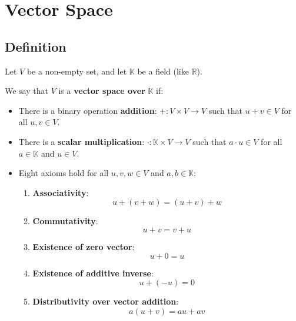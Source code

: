 \section{Vector Space}
\label{sec:vector-space}

\subsection{Definition}
\label{subsec:definition}

Let \( V \) be a non-empty set, and let \( \mathbb{K} \) be a field (like \(\mathbb{R}\)).

We say that \( V \) is a \textbf{vector space over} \( \mathbb{K} \) if:

\begin{itemize}
    \item There is a binary operation \textbf{addition}: \( +: V \times V \to V \) such that \( u + v \in V \) for all \( u, v \in V \).
    \item There is a \textbf{scalar multiplication}: \( \cdot: \mathbb{K} \times V \to V \) such that \( a \cdot u \in V \) for all \( a \in \mathbb{K} \) and \( u \in V \).
    \item Eight axioms hold for all \( u, v, w \in V \) and \( a, b \in \mathbb{K} \):
    \begin{enumerate}
        \item \textbf{Associativity}:
        \begin{equation}
            u + (v + w) = (u + v) + w
        \end{equation}
        \item \textbf{Commutativity}:
        \begin{equation}
            u + v = v + u
        \end{equation}
        \item \textbf{Existence of zero vector}:
        \begin{equation}
            u + 0 = u
        \end{equation}
        \item \textbf{Existence of additive inverse}:
        \begin{equation}
            u + (-u) = 0
        \end{equation}
        \item \textbf{Distributivity over vector addition}:
        \begin{equation}
            a(u + v) = au + av
        \end{equation}

\end{enumerate}
\end{itemize}

